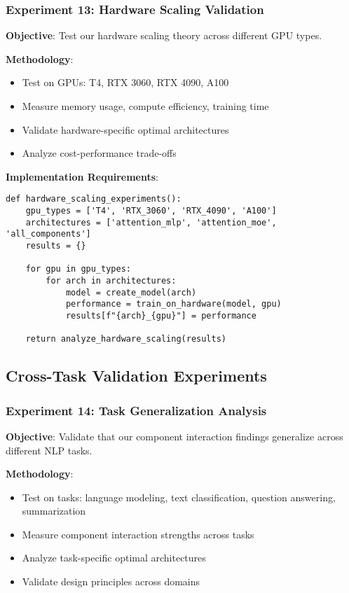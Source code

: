 \documentclass[11pt,a4paper]{article}
\begin{document}
\subsubsection{Experiment 13: Hardware Scaling Validation}
\textbf{Objective}: Test our hardware scaling theory across different GPU types.

\textbf{Methodology}:
\begin{itemize}
    \item Test on GPUs: T4, RTX 3060, RTX 4090, A100
    \item Measure memory usage, compute efficiency, training time
    \item Validate hardware-specific optimal architectures
    \item Analyze cost-performance trade-offs
\end{itemize}

\textbf{Implementation Requirements}:
\begin{verbatim}
def hardware_scaling_experiments():
    gpu_types = ['T4', 'RTX_3060', 'RTX_4090', 'A100']
    architectures = ['attention_mlp', 'attention_moe', 'all_components']
    results = {}
    
    for gpu in gpu_types:
        for arch in architectures:
            model = create_model(arch)
            performance = train_on_hardware(model, gpu)
            results[f"{arch}_{gpu}"] = performance
    
    return analyze_hardware_scaling(results)
\end{verbatim}

\subsection{Cross-Task Validation Experiments}

\subsubsection{Experiment 14: Task Generalization Analysis}
\textbf{Objective}: Validate that our component interaction findings generalize across different NLP tasks.

\textbf{Methodology}:
\begin{itemize}
    \item Test on tasks: language modeling, text classification, question answering, summarization
    \item Measure component interaction strengths across tasks
    \item Analyze task-specific optimal architectures
    \item Validate design principles across domains
\end{itemize}
\end{document}

